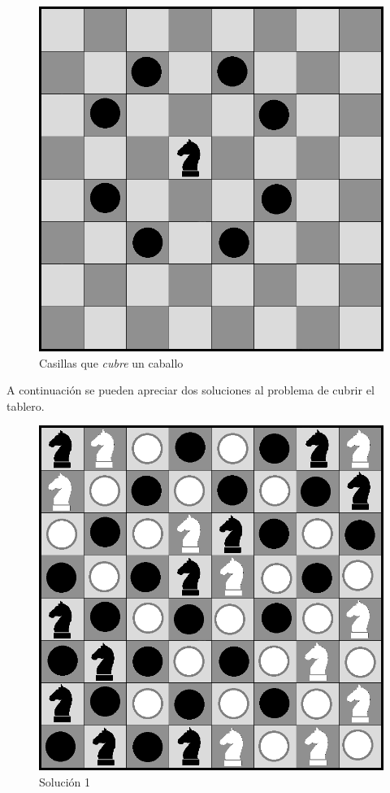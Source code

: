 \documentclass[a4paper]{article}
\begin{document}
 \begin{figure}[h!]
   \begin{center}
 	\includegraphics[scale=0.3]{imagenes/ej3/caballito.png}
 	\caption{Casillas que \emph{cubre} un caballo}
 	\label{caballito}	
   \end{center}
 \end{figure}


A continuaci\'on se pueden apreciar dos soluciones al problema de cubrir el tablero.

 \begin{figure}[h!]
   \begin{center}
 	\includegraphics[scale=0.3]{imagenes/ej3/optimaCreo.png}
 	\caption{Soluci\'on 1}
   \end{center}
 \end{figure}
 
\end{document}
